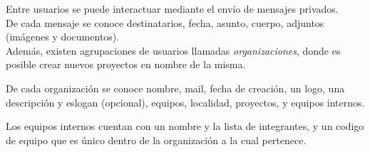 \documentclass[a4paper,10pt]{article}
\begin{document}
    Entre usuarios se puede interactuar mediante el envío de mensajes privados. \\
    De cada mensaje se conoce destinatarios, fecha, asunto, cuerpo, adjuntos (imágenes y documentos). \\

    Además, existen agrupaciones de usuarios llamadas \textit{organizaciones}, donde es posible crear nuevos proyectos en nombre de la misma.
    
    De cada organización se conoce nombre, mail, fecha de creación, un logo, una descripción y eslogan (opcional), equipos, localidad, proyectos, y equipos internos.
    
    Los equipos internos cuentan con un nombre y la lista de integrantes, y un codigo de equipo que es único dentro de la organización a la cual pertenece.
\end{document}
